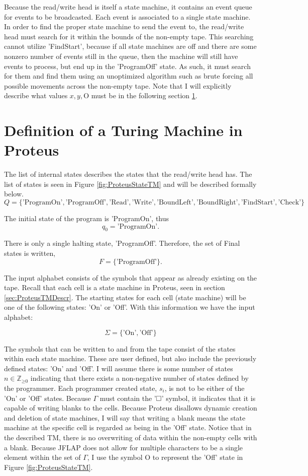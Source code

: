 Because the read/write head is itself a state machine, it contains an event queue for events to be broadcasted.
Each event is associated to a single state machine.
In order to find the proper state machine to send the event to, the read/write head must search for it within the bounds of the non-empty tape.
This searching cannot utilize 'FindStart', because if all state machines are off and there are some nonzero number of events still in the queue, then the machine will still have events to process, but end up in the 'ProgramOff' state.
As such, it must search for them and find them using an unoptimized algorithm such as brute forcing all possible movements across the non-empty tape.
Note that I will explicitly describe what values $x, y, \text{O}$ must be in the following section \ref{sec:DefnTMProteus}.

\section{Definition of a Turing Machine in Proteus}\label{sec:DefnTMProteus}

The list of internal states describes the states that the read/write head has.
The list of states is seen in Figure \ref{fig:ProteusStateTM} and will be described formally below.
\[
Q = \{\text{'ProgramOn'}, \text{'ProgramOff'}, \text{'Read'}, \text{'Write'}, \text{'BoundLeft'}, \text{'BoundRight'}, \text{'FindStart'}, \text{'Check'}\}
\]

The initial state of the program is 'ProgramOn', thus \[q_{0} = \text{'ProgramOn'}.\]

There is only a single halting state, 'ProgramOff'.
Therefore, the set of Final states is written, \[F = \{\text{'ProgramOff'}\}.\]

The input alphabet consists of the symbols that appear as already existing on the tape.
Recall that each cell is a state machine in Proteus, seen in section \ref{sec:ProteusTMDescr}.
The starting states for each cell (state machine) will be one of the following states: 'On' or 'Off'.
With this information we have the input alphabet:

\[
\Sigma = \{\text{'On'}, \text{'Off'}\}
\]

The symbols that can be written to and from the tape consist of the states within each state machine.
These are user defined, but also include the previously defined states: 'On' and 'Off'.
I will assume there is some number of states $n \in \mathbb{Z}_{\geq \text{0}}$ indicating that there exists a non-negative number of states defined by the programmer.
Each programmer created state, $s_i$, is not to be either of the 'On' or 'Off' states.
Because $\Gamma$ must contain the '$\raisebox{0.1cm}{\fbox{}}$' symbol, it indicates that it is capable of writing blanks to the cells.
Because Proteus disallows dynamic creation and deletion of state machines, I will say that writing a blank means the state machine at the specific cell is regarded as being in the 'Off' state.
Notice that in the described TM, there is no overwriting of data within the non-empty cells with a blank.
Because JFLAP does not allow for multiple characters to be a single element within the set of $\Gamma$, I use the symbol O to represent the 'Off' state in Figure \ref{fig:ProteusStateTM}.

